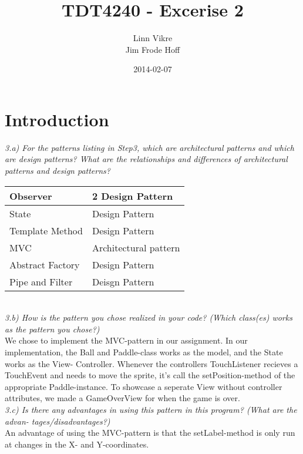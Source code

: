 \documentclass[]{article}
\title{TDT4240 - Excerise 2}
\author{Linn Vikre\\ Jim Frode Hoff}
\date{2014-02-07}
\begin{document}
\ifpdf
{}
\else
{}
\fi

\maketitle

\section{Introduction}
\emph{3.a) For the patterns listing in Step3, which are architectural patterns 
and which are design patterns? What are the relationships and differences of 
architectural patterns and design patterns?}
\\

\begin{tabular}{ | l | l | } \hline
  Observer & 2 Design Pattern \\ \hline
  State & Design Pattern \\ \hline
  Template Method & Design Pattern \\ \hline
  MVC & Architectural pattern \\ \hline
  Abstract Factory & Design Pattern \\ \hline
  Pipe and Filter & Deisgn Pattern \\ \hline
\end{tabular}
\\

\emph{3.b) How is the pattern you chose realized in your code? (Which class(es)
 works as the pattern you chose?)}
\\
We chose to implement the MVC-pattern in our assignment. In our implementation, 
the Ball and Paddle-class works as the model, and the State works as the View- Controller. 
Whenever the controllers TouchListener recieves a TouchEvent and needs to move the sprite, it’s call the 
setPosition-method of the appropriate Paddle-instance. To showcase a seperate View without controller attributes, we made a GameOverView for when the game is over.\\

\emph{3.c) Is there any advantages in using this pattern in this program? (What are the advan- tages/disadvantages?)}\\
An advantage of using the MVC-pattern is that the setLabel-method is only run at changes in the X- and Y-coordinates.






\end{document}
